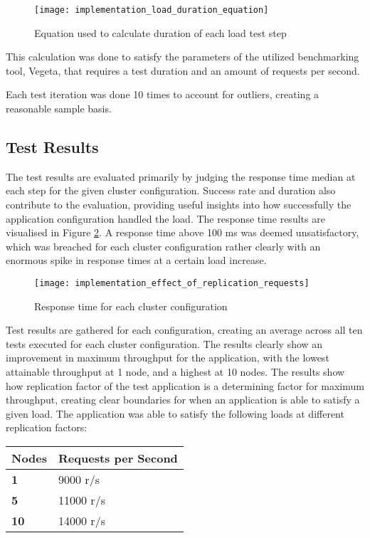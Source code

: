 \begin{figure}[!htb]
  \texttt{[image: implementation\_load\_duration\_equation]}  
  \caption{Equation used to calculate duration of each load test step}
  \label{fig:implementation_load_duration_equation}
\end{figure}

This calculation was done to satisfy the parameters of the utilized benchmarking tool, Vegeta, that requires a test duration and an amount of requests per second.

Each test iteration was done 10 times to account for outliers, creating a reasonable sample basis.


\subsection{Test Results}
The test results are evaluated primarily by judging the response time median at each step for the given cluster configuration. Success rate and duration also contribute to the evaluation, providing useful insights into how successfully the application configuration handled the load. The response time results are visualised in Figure \ref{fig:implementation_effect_of_replication_requests}. A response time above 100 ms was deemed unsatisfactory, which was breached for each cluster configuration rather clearly with an enormous spike in response times at a certain load increase. 

\begin{figure}[!htb]
  \texttt{[image: implementation\_effect\_of\_replication\_requests]}  
  \caption{Response time for each cluster configuration}
  \label{fig:implementation_effect_of_replication_requests}
\end{figure}

Test results are gathered for each configuration, creating an average across all ten tests executed for each cluster configuration. The results clearly show an improvement in maximum throughput for the application, with the lowest attainable throughput at 1 node, and a highest at 10 nodes. The results show how replication factor of the test application is a determining factor for maximum throughput, creating clear boundaries for when an application is able to satisfy a given load. The application was able to satisfy the following loads at different replication factors:

\begin{center}
\begin{tabular}{ |p{2cm}|p{5cm}|  }
 \hline
{\textbf{Nodes}} & {\textbf{Requests per Second}}\\
 \hline
 \textbf{1} & 9000 r/s\\
 \hline
 \textbf{5} & 11000 r/s\\ 
 \hline
 \textbf{10} & 14000 r/s\\ 
 \hline
\end{tabular}
\end{center}

